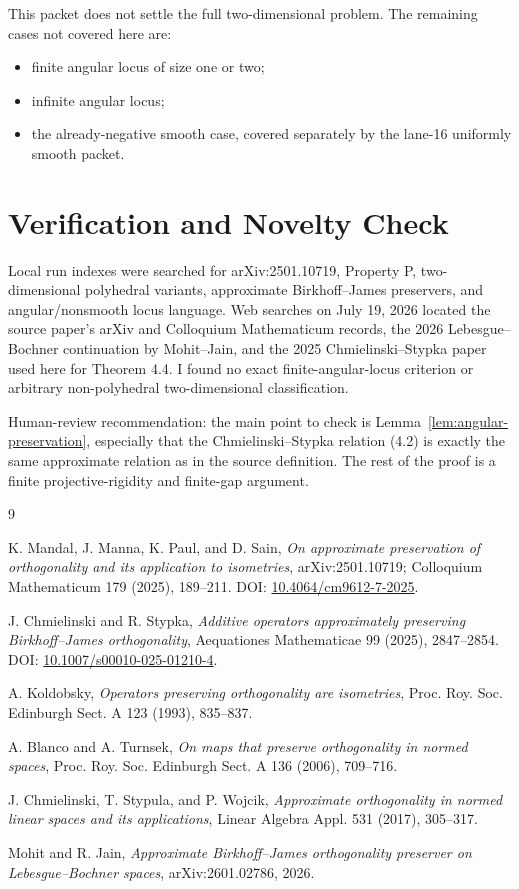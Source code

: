 \documentclass[11pt]{article}
\begin{document}
This packet does not settle the full two-dimensional problem.  The remaining
cases not covered here are:
\begin{itemize}
  \item finite angular locus of size one or two;
  \item infinite angular locus;
  \item the already-negative smooth case, covered separately by the lane-16
  uniformly smooth packet.
\end{itemize}

\section*{Verification and Novelty Check}

Local run indexes were searched for arXiv:2501.10719, Property P,
two-dimensional polyhedral variants, approximate Birkhoff--James preservers,
and angular/nonsmooth locus language.  Web searches on July 19, 2026 located
the source paper's arXiv and Colloquium Mathematicum records, the 2026
Lebesgue--Bochner continuation by Mohit--Jain, and the 2025
Chmielinski--Stypka paper used here for Theorem 4.4.  I found no exact
finite-angular-locus criterion or arbitrary non-polyhedral two-dimensional
classification.

Human-review recommendation: the main point to check is
Lemma~\ref{lem:angular-preservation}, especially that the Chmielinski--Stypka
relation (4.2) is exactly the same approximate relation as in the source
definition.  The rest of the proof is a finite projective-rigidity and
finite-gap argument.

\begin{thebibliography}{9}

K. Mandal, J. Manna, K. Paul, and D. Sain,
\emph{On approximate preservation of orthogonality and its application to
isometries}, arXiv:2501.10719; Colloquium Mathematicum 179 (2025), 189--211.
DOI: \href{https://doi.org/10.4064/cm9612-7-2025}{10.4064/cm9612-7-2025}.

J. Chmielinski and R. Stypka,
\emph{Additive operators approximately preserving Birkhoff--James
orthogonality}, Aequationes Mathematicae 99 (2025), 2847--2854.
DOI: \href{https://doi.org/10.1007/s00010-025-01210-4}{10.1007/s00010-025-01210-4}.

A. Koldobsky,
\emph{Operators preserving orthogonality are isometries}, Proc. Roy. Soc.
Edinburgh Sect. A 123 (1993), 835--837.

A. Blanco and A. Turnsek,
\emph{On maps that preserve orthogonality in normed spaces}, Proc. Roy. Soc.
Edinburgh Sect. A 136 (2006), 709--716.

J. Chmielinski, T. Stypula, and P. Wojcik,
\emph{Approximate orthogonality in normed linear spaces and its applications},
Linear Algebra Appl. 531 (2017), 305--317.

Mohit and R. Jain,
\emph{Approximate Birkhoff--James orthogonality preserver on
Lebesgue--Bochner spaces}, arXiv:2601.02786, 2026.

\end{thebibliography}
\end{document}
